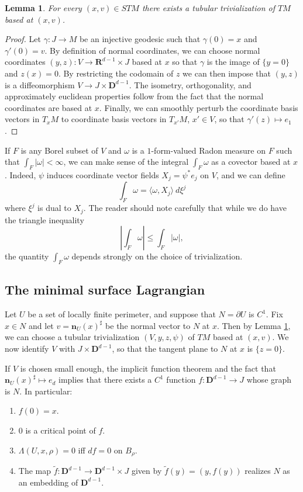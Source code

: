 \documentclass[reqno,12pt,letterpaper]{amsart}
\newcommand{\RR}{\mathbf{R}}
\newcommand{\DD}{\mathbf{D}}
\newcommand{\normal}{\mathbf n}
\newtheorem{lemma}[theorem]{Lemma}
\theoremstyle{definition}
\numberwithin{equation}{section}
\begin{document}
\begin{lemma}\label{existence of trivializations}
For every $(x, v) \in STM$ there exists a tubular trivialization of $TM$ based at $(x, v)$.
\end{lemma}
\begin{proof}
Let $\gamma: J \to M$ be an injective geodesic such that $\gamma(0) = x$ and $\gamma'(0) = v$.
By definition of normal coordinates, we can choose normal coordinates $(y, z): V \to \RR^{d - 1} \times J$ based at $x$ so that $\gamma$ is the image of $\{y = 0\}$ and $z(x) = 0$.
By restricting the codomain of $z$ we can then impose that $(y, z)$ is a diffeomorphism $V \to J \times \DD^{d - 1}$.
The isometry, orthogonality, and approximately euclidean properties follow from the fact that the normal coordinates are based at $x$.
Finally, we can smoothly perturb the coordinate basis vectors in $T_xM$ to coordinate basis vectors in $T_{x'}M$, $x' \in V$, so that $\gamma'(z) \mapsto e_1$.
\end{proof}

If $F$ is any Borel subset of $V$ and $\omega$ is a $1$-form-valued Radon measure on $F$ such that $\int_F |\omega| < \infty$, we can make sense of the integral $\int_F \omega$ as a covector based at $x$.
Indeed, $\psi$ induces coordinate vector fields $X_j = \psi^* e_j$ on $V$, and we can define
$$\int_F \omega = \langle \omega, X_j\rangle ~d\xi^j$$
where $\xi^j$ is dual to $X_j$.
The reader should note carefully that while we do have the triangle inequality
\begin{equation}\label{excess triangle inequality}
\left|\int_F \omega\right| \leq \int_F |\omega|,
\end{equation}
the quantity $\int_F \omega$ depends strongly on the choice of trivialization.

\subsection{The minimal surface Lagrangian}
Let $U$ be a set of locally finite perimeter, and suppose that $N = \partial U$ is $C^1$.
Fix $x \in N$ and let $v = \normal_U(x)^\sharp$ be the normal vector to $N$ at $x$.
Then by Lemma \ref{existence of trivializations}, we can choose a tubular trivialization $(V, y, z, \psi)$ of $TM$ based at $(x, v)$.
We now identify $V$ with $J \times \DD^{d - 1}$, so that the tangent plane to $N$ at $x$ is $\{z = 0\}$.

If $V$ is chosen small enough, the implicit function theorem and the fact that $\normal_U(x)^\sharp \mapsto e_d$ implies that there exists a $C^1$ function $f: \DD^{d - 1} \to J$ whose graph is $N$.
In particular:
\begin{enumerate}
\item $f(0) = x$.
\item $0$ is a critical point of $f$.
\item $\Lambda(U, x, \rho) = 0$ iff $df = 0$ on $B_\rho$.
\item The map $\tilde f: \DD^{d - 1} \to \DD^{d - 1} \times J$ given by $\tilde f(y) = (y, f(y))$ realizes $N$ as an embedding of $\DD^{d - 1}$.
\end{enumerate}
\end{document}
